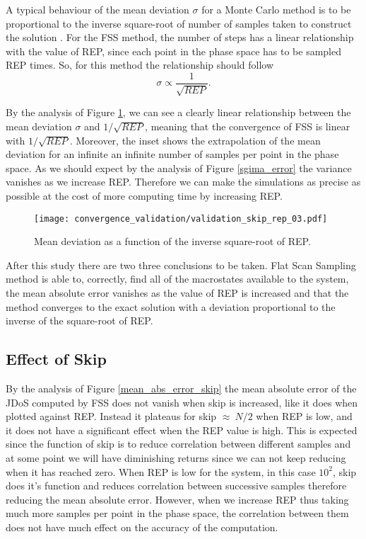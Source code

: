 	A typical behaviour of the mean deviation $\sigma$ for a Monte Carlo method is to be proportional to the inverse square-root of number of samples taken to construct the solution \cite{Landau_Book}. For the FSS method, the number of steps has a linear relationship with the value of REP, since each point in the phase space has to be sampled REP times. So, for this method the relationship should follow 
\begin{equation}\label{standard_mc}
	\sigma \propto \frac{1}{\sqrt{REP}}.
\end{equation}

	By the analysis of Figure \ref{sigma_rep}, we can see a clearly linear relationship between the mean deviation $\sigma$ and $1/\sqrt{REP}$, meaning that the convergence of FSS is linear with $1/\sqrt{REP}$. Moreover, the inset shows the extrapolation of the mean deviation for an infinite an infinite number of samples per point in the phase space. As we should expect by the analysis of Figure \ref{sgima_error} the variance vanishes as we increase REP. Therefore we can make the simulations as precise as possible at the cost of more computing time by increasing REP.
	
\begin{figure}[h]
	\centering
	\texttt{[image: convergence\_validation/validation\_skip\_rep\_03.pdf]}
	\caption{Mean deviation as a function of the inverse square-root of REP.}
	\label{sigma_rep}
\end{figure}

	After this study there are two three conclusions to be taken. Flat Scan Sampling method is able to, correctly, find all of the macrostates available to the system, the mean absolute error vanishes as the value of REP is increased and that the method converges to the exact solution with a deviation proportional to the inverse of the square-root of REP.

\subsection{Effect of Skip}

	By the analysis of Figure \ref{mean_abs_error_skip} the mean absolute error of the JDoS computed by FSS does not vanish when skip is increased, like it does when plotted against REP. Instead it plateaus for skip $\approx\ N/2$ when REP is low, and it does not have a significant effect when the REP value is high. This is expected since the function of skip is to reduce correlation between different samples and at some point we will have diminishing returns since we can not keep reducing when it has reached zero. 
When REP is low for the system, in this case $10^2$, skip does it's function and reduces correlation between successive samples therefore reducing the mean absolute error. 
However, when we increase REP thus taking much more samples per point in the phase space, the correlation between them does not have much effect on the accuracy of the computation. 

